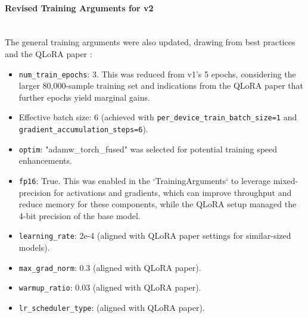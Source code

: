 \paragraph{Revised Training Arguments for v2} \mbox{}\\
The general training arguments were also updated, drawing from best practices and the QLoRA paper \cite{dettmers2023qlora}:
\begin{itemize}
    \sloppy
    \item \texttt{num\_train\_epochs}: 3. This was reduced from v1's 5 epochs, considering the larger 80,000-sample training set and indications from the QLoRA paper that further epochs yield marginal gains.
    \item Effective batch size: 6 (achieved with \texttt{per\_device\_train\_batch\_size=1} and \texttt{gradient\_accumulation\_steps=6}).
    \item \texttt{optim}: "adamw\_torch\_fused" was selected for potential training speed enhancements.
    \item \texttt{fp16}: True. This was enabled in the `TrainingArguments` to leverage mixed-precision for activations and gradients, which can improve throughput and reduce memory for these components, while the QLoRA setup managed the 4-bit precision of the base model.
    \item \texttt{learning\_rate}: 2e-4 (aligned with QLoRA paper settings for similar-sized models).
    \item \texttt{max\_grad\_norm}: 0.3 (aligned with QLoRA paper).
    \item \texttt{warmup\_ratio}: 0.03 (aligned with QLoRA paper).
    \item \texttt{lr\_scheduler\_type}: (aligned with QLoRA paper).
\end{itemize}

